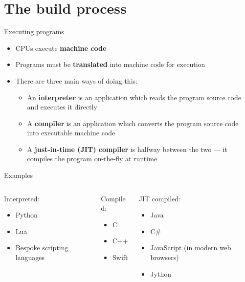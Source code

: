 \part{The build process}
\frame{\partpage}

\begin{frame}{Executing programs}
    \begin{itemize}
        \item CPUs execute \textbf{machine code}
        \item Programs must be \textbf{translated} into machine code for execution
        \item There are three main ways of doing this:
        \begin{itemize}
            \item An \textbf{interpreter} is an application which reads the program source code and executes it directly
            \item A \textbf{compiler} is an application which converts the program source code into executable machine code
            \item A \textbf{just-in-time (JIT) compiler} is halfway between the two --- it compiles the program on-the-fly
                at runtime
        \end{itemize}
    \end{itemize}
\end{frame}

\begin{frame}{Examples}
	\begin{columns}[t,onlytextwidth]
		\begin{column}{0.3\textwidth}
		    Interpreted:
		    \begin{itemize}
		        \item Python
		        \item Lua
		        \item Bespoke scripting languages
		    \end{itemize}
		\end{column}
		\begin{column}{0.3\textwidth}
		    Compiled:
		    \begin{itemize}
		        \item C
		        \item C++
		        \item Swift
		    \end{itemize}
		\end{column}
		\begin{column}{0.3\textwidth}
		    JIT compiled:
		    \begin{itemize}
		        \item Java
		        \item C\#
		        \item JavaScript (in modern web browsers)
		        \item Jython
		    \end{itemize}
		\end{column}
	\end{columns}
\end{frame}

